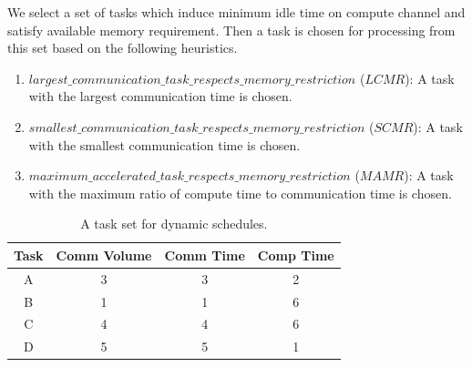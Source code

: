 \documentclass[sigconf]{acmart}
\begin{document}
	We select a set of tasks which induce minimum idle time on compute channel and satisfy available memory requirement. Then a task is chosen for processing from this set based on the following heuristics.
	\begin{enumerate}[label=\roman*)]
		
		\item $largest \_ \allowbreak communication \_ \allowbreak task \_ \allowbreak respects \_ \allowbreak memory \_ \allowbreak restriction$ ($LCMR$): A task with the largest communication time is chosen. 
		\item $smallest \_ \allowbreak communication \_ \allowbreak task \_ \allowbreak respects \_ \allowbreak memory \_ \allowbreak restriction$ ($SCMR$): A task with the smallest communication time is chosen.
		\item $maximum \_ \allowbreak accelerated \_ \allowbreak task \_ \allowbreak respects \_ \allowbreak memory \_ \allowbreak restriction$ ($MAMR$): A task with the maximum ratio of compute time to communication time is chosen.
	\end{enumerate}
	\begin{table}[htb]
		\begin{center}
			
			\begin{tabular}{|c|c|c|c|}
				\hline
				Task & Comm Volume & Comm Time & Comp Time\\ \hline 
				A & 3 & 3 & 2\\ \hline
				B & 1 & 1 &  6\\ \hline
				C & 4 & 4 & 6\\ \hline
				D & 5 & 5 & 1\\ \hline
			\end{tabular}
			\caption{\label{tab:dynamicSelectionExample} A task set for dynamic schedules.}
		\end{center}
	\end{table}
	
\end{document}
